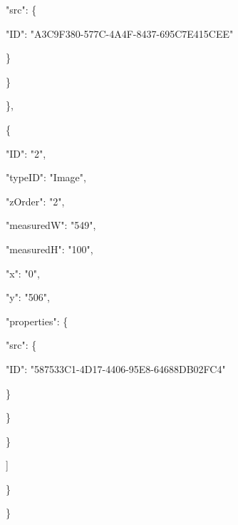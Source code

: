 \documentclass[13pt]{article}
\begin{document}
{\raggedright
{\footnotesize                                         "src": \{}
}

{\raggedright
{\footnotesize                                             "ID":
"A3C9F380-577C-4A4F-8437-695C7E415CEE"}
}

{\raggedright
{\footnotesize                                         \}}
}

{\raggedright
{\footnotesize                                     \}}
}

{\raggedright
{\footnotesize                                 \},}
}

{\raggedright
{\footnotesize                                 \{}
}

{\raggedright
{\footnotesize                                     "ID": "2",}
}

{\raggedright
{\footnotesize                                     "typeID": "Image",}
}

{\raggedright
{\footnotesize                                     "zOrder": "2",}
}

{\raggedright
{\footnotesize                                     "measuredW": "549",}
}

{\raggedright
{\footnotesize                                     "measuredH": "100",}
}

{\raggedright
{\footnotesize                                     "x": "0",}
}

{\raggedright
{\footnotesize                                     "y": "506",}
}

{\raggedright
{\footnotesize                                     "properties": \{}
}

{\raggedright
{\footnotesize                                         "src": \{}
}

{\raggedright
{\footnotesize                                             "ID":
"587533C1-4D17-4406-95E8-64688DB02FC4"}
}

{\raggedright
{\footnotesize                                         \}}
}

{\raggedright
{\footnotesize                                     \}}
}

{\raggedright
{\footnotesize                                 \}}
}

{\raggedright
{\footnotesize                             ]}
}

{\raggedright
{\footnotesize                         \}}
}

{\raggedright
{\footnotesize                     \}}
}
\end{document}
